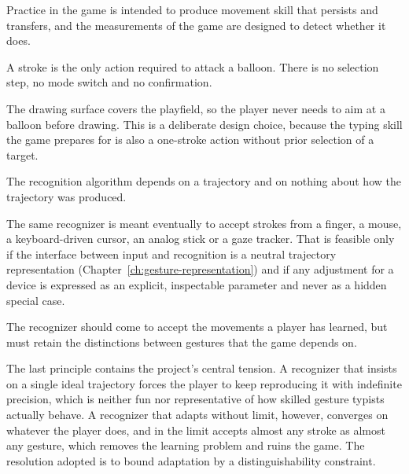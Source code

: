 \begin{principle}\label{pr:motor}
Practice in the game is intended to produce movement skill that persists and transfers, and the measurements of the game are designed to detect whether it does.
\end{principle}

\begin{principle}\label{pr:overhead}
A stroke is the only action required to attack a balloon. There is no selection step, no mode switch and no confirmation.
\end{principle}

The drawing surface covers the playfield, so the player never needs to aim at a balloon before drawing. This is a deliberate design choice, because the typing skill the game prepares for is also a one-stroke action without prior selection of a target.

\begin{principle}\label{pr:independence}
The recognition algorithm depends on a trajectory and on nothing about how the trajectory was produced.
\end{principle}

The same recognizer is meant eventually to accept strokes from a finger, a mouse, a keyboard-driven cursor, an analog stick or a gaze tracker. That is feasible only if the interface between input and recognition is a neutral trajectory representation (Chapter~\ref{ch:gesture-representation}) and if any adjustment for a device is expressed as an explicit, inspectable parameter and never as a hidden special case.

\begin{principle}\label{pr:accommodation}
The recognizer should come to accept the movements a player has learned, but must retain the distinctions between gestures that the game depends on.
\end{principle}

The last principle contains the project's central tension. A recognizer that insists on a single ideal trajectory forces the player to keep reproducing it with indefinite precision, which is neither fun nor representative of how skilled gesture typists actually behave. A recognizer that adapts without limit, however, converges on whatever the player does, and in the limit accepts almost any stroke as almost any gesture, which removes the learning problem and ruins the game. The resolution adopted is to bound adaptation by a distinguishability constraint.

